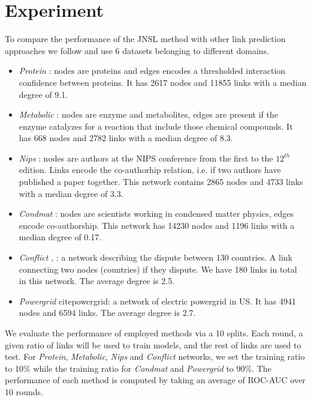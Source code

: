 \documentclass[runningheads,a4paper]{llncs}
\begin{document}
\section{Experiment}
To compare the performance of the JNSL method with other link prediction approaches we follow \cite{matrix-factorization} and use 6 datasets belonging to different domains.
\begin{itemize}
\item \textit{Protein }\cite{protein-protein}: nodes are proteins and edges encodes a thresholded interaction confidence between proteins. It has 2617 nodes and 11855 links with a median degree of 9.1.

\item \textit{Metabolic} \cite{metabolic}: nodes are enzyme and metabolites, edges are present if the enzyme catalyzes for a reaction that include those chemical compounds. It has 668 nodes and 2782 links with a median degree of 8.3.

\item \textit{Nips} \cite{nips}: nodes are authors at the NIPS conference from the first to the $12^{th}$ edition. Links encode the co-authorhip relation, i.e. if two authors have published a paper together. This network contains 2865 nodes and 4733 links with a median degree of 3.3.

\item \textit{Condmat} \cite{condmat}: nodes are scientists working in condensed matter physics, edges encode co-authorship. This network has 14230 nodes and 1196 links with a median degree of 0.17.

\item \textit{Conflict} \cite{conflict1}, \cite{conflict2}: a network describing the dispute between 130 countries. A link connecting two nodes (countries) if they dispute. We have 180 links in total in this network. The average degree is 2.5.

\item \textit{Powergrid} cite{powergrid}: a network of electric powergrid in US. It has 4941 nodes and 6594 links. The average degree is 2.7.
\end{itemize}

We evaluate the performance of employed methods via a 10 splits. Each round, a given ratio of links will be used to train models, and the rest of links are used to test. For \textit{Protein}, \textit{Metabolic}, \textit{Nips} and \textit{Conflict} networks, we set the training ratio to 10$\%$ while the training ratio for \textit{Condmat} and \textit{Powergrid} to 90$\%$. The performance of each method is computed by taking an average of ROC-AUC over 10 rounds.
\end{document}
